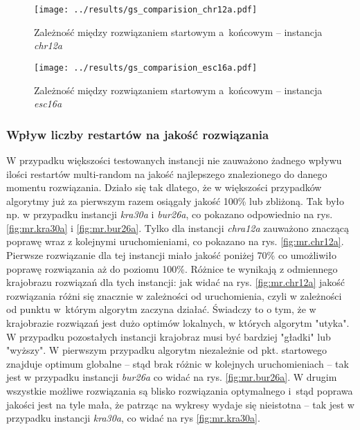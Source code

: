 \documentclass{article}
\begin{document}
			\begin{figure}[h]
				\texttt{[image: ../results/gs\_comparision\_chr12a.pdf]}
				\caption{Zależność między rozwiązaniem startowym a~końcowym -- instancja \emph{chr12a}\label{fig:gs.chr12a}}				
			\end{figure}
			
			\begin{figure}[h]
				\texttt{[image: ../results/gs\_comparision\_esc16a.pdf]}
				\caption{Zależność między rozwiązaniem startowym a~końcowym -- instancja \emph{esc16a}\label{fig:gs.esc16a}}				
			\end{figure}
		
		\subsubsection{Wpływ liczby restartów na jakość rozwiązania}		
			W przypadku większości testowanych instancji nie zauważono żadnego wpływu ilości restartów multi-random na jakość najlepszego znalezionego do danego momentu rozwiązania. Działo się tak dlatego, że w większości przypadków algorytmy już za pierwszym razem osiągały jakość  100\%  lub zbliżoną. Tak było np. w przypadku instancji \emph{kra30a} i \emph{bur26a}, co pokazano odpowiednio na rys. \ref{fig:mr.kra30a} i \ref{fig:mr.bur26a}. Tylko dla instancji \emph{chra12a} zauważono znaczącą poprawę wraz z kolejnymi uruchomieniami, co pokazano na rys. \ref{fig:mr.chr12a}. Pierwsze rozwiązanie dla tej instancji miało jakość poniżej 70\% co umożliwiło poprawę rozwiązania aż do poziomu 100\%. Różnice te wynikają z odmiennego krajobrazu rozwiązań dla tych instancji: jak widać na rys. \ref{fig:mr.chr12a} jakość rozwiązania różni się znacznie w zależności od uruchomienia, czyli w zależności od punktu w~którym algorytm zaczyna działać. Świadczy to o tym, że w krajobrazie rozwiązań jest dużo optimów lokalnych, w których algorytm "utyka". W przypadku pozostałych instancji krajobraz musi być bardziej "gładki" lub "wyższy". W pierwszym przypadku algorytm niezależnie od pkt. startowego znajduje optimum globalne -- stąd brak różnic w kolejnych uruchomieniach -- tak jest w przypadku instancji \emph{bur26a} co widać na rys. \ref{fig:mr.bur26a}. W drugim wszystkie możliwe rozwiązania są blisko rozwiązania optymalnego i~stąd poprawa jakości jest na tyle mała, że patrząc na wykresy wydaje się nieistotna -- tak jest w przypadku instancji \emph{kra30a}, co widać na rys \ref{fig:mr.kra30a}.
\end{document}
